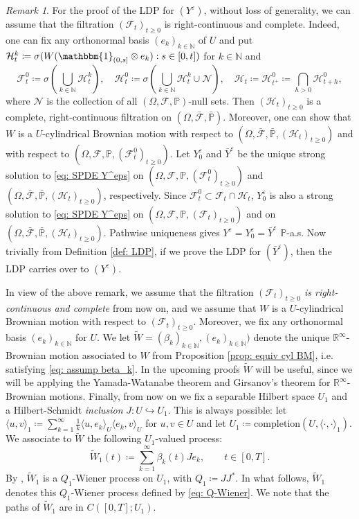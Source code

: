 \documentclass{amsart}
\newcommand{\one}{\mathbbm{1}}
\newcommand{\<}{\langle}
\newcommand{\?}{\rangle}
\newcommand{\into}{\hookrightarrow}
\theoremstyle{plain}
\theoremstyle{remark}
\newtheorem{remark}[theorem]{Remark}
\theoremstyle{plain}
\numberwithin{equation}{section}
\def\N{{\mathbb N}}
\def\R{{\mathbb R}}
\newcommand{\F}{\mathcal{F}}
\renewcommand{\P}{\mathbb{P}}
\newcommand{\Om}{\Omega}
\newcommand{\eps}{\varepsilon}
\begin{document}
\begin{remark}
For the proof of the LDP for $(Y^\eps)$, without loss of generality, we can assume that the filtration $(\F_t)_{t\geq 0}$ is right-continuous and complete. Indeed, one can fix any orthonormal basis $(e_k)_{k\in \N}$ of $U$ and put  $\mathcal{H}^k_t\coloneqq \sigma(W(\one_{(0,s]}\otimes e_k):s\in[0,t])$ for $k\in\N$ and
\[
\F^0_t\coloneqq \sigma(\bigcup_{k\in\N}\mathcal{H}^k_t), \quad \mathcal{H}^0_t\coloneqq \sigma(\bigcup_{k\in\N}\mathcal{H}^k_t\cup \mathcal{N}), \quad \mathcal{H}_t\coloneqq \mathcal{H}^0_{t^+}\coloneqq \bigcap_{h>0}\mathcal{H}^0_{t+h},
\]
where $\mathcal{N}$ is the collection of all $(\Om,\F,\P)$-null sets. Then $(\mathcal{H}_t)_{t\geq 0}$ is a complete, right-continuous filtration on $(\Om,\bar{\F},\bar{\P})$. Moreover, one can show that $W$ is a $U$-cylindrical Brownian motion with respect to $(\Om,\bar{\F},\bar{\P}, (\mathcal{H}_t)_{t\geq 0})$ and with respect to $(\Om,{\F},{\P}, (\F^0_t)_{t\geq 0})$. Let $Y^\eps_0$ and $\bar{Y}^\eps$  be the unique strong solution to \eqref{eq: SPDE Y^eps} on $(\Om,{\F},{\P}, (\F^0_t)_{t\geq 0})$ and $(\Om,\bar{\F},\bar{\P},(\mathcal{H}_t)_{t\geq 0})$, respectively. Since $\F^0_t\subset \F_t \cap\mathcal{H}_t$, $Y^\eps_0$  is also a strong solution to \eqref{eq: SPDE Y^eps} on $(\Om,{\F},{\P},(\F_t)_{t\geq 0})$ and on $(\Om,\bar{\F},\bar{\P},(\mathcal{H}_t)_{t\geq 0})$. Pathwise uniqueness gives  ${Y}^\eps=Y_0^\eps=\bar{Y}^\eps$ $\P$-a.s. Now trivially from Definition \ref{def: LDP}, if we prove the LDP for $(\bar{Y}^\eps)$, then the LDP carries over to $(Y^\eps)$.
\end{remark}

In view of the above remark, we assume that the filtration \emph{$(\F_t)_{t\geq 0}$ is right-continuous and complete} from now on, and we assume that  $W$ is a $U$-cylindrical Brownian motion with respect to $(\F_t)_{t\geq 0}$.
Moreover, we fix any orthonormal basis $(e_k)_{k\in \N}$ for $U$.
We let $\tilde{W}=(\beta_k)_{k\in\N},(e_k)_{k\in\N})$ denote the  unique $\R^\infty$-Brownian motion associated to $W$ from Proposition \ref{prop: equiv cyl BM}, i.e. \!satisfying \eqref{eq: assump beta_k}.
In the upcoming proofs $\tilde{W}$ will be useful, since we will be applying the Yamada-Watanabe theorem and Girsanov's theorem for $\R^\infty$-Brownian motions.
Finally, from now on we fix a separable Hilbert space $U_1$ and a Hilbert-Schmidt \emph{inclusion}
$J\colon U\into U_1$. This is always possible: let $\<u,v\?_1\coloneqq \sum_{k=1}^\infty \frac{1}{k}\<u,e_k\?_U \<e_k,v\?_U$ for $u,v\in U$ and let $U_1\coloneqq \mathrm{completion}(U, \<\cdot,\cdot\?_1)$.
We associate to $\tilde{W}$ the following $U_1$-valued process:
\begin{equation}\label{eq: Q-Wiener}
\tilde{W}_1(t)\coloneqq \sum_{k=1}^{\infty}\beta_k(t)J e_k, \qquad t\in[0,T].
\end{equation}
By \cite[Prop. 2.5.2]{liurockner15}, $\tilde{W}_1$ is a $Q_1$-Wiener process on $U_1$, with $Q_1\coloneqq JJ^*$.
In what follows,
$\tilde{W}_1$ denotes this $Q_1$-Wiener process defined by \eqref{eq: Q-Wiener}. We note that the paths of $\tilde{W}_1$ are in $C([0,T];U_1)$.
\end{document}
